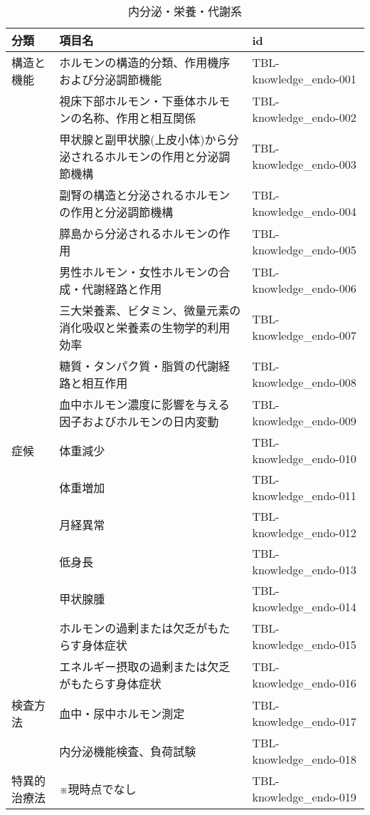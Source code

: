 \begin{xltabular}{\linewidth}{XXX}
\caption{\label{tbl:knowledge_endo}内分泌・栄養・代謝系} \\
\toprule
分類 & 項目名 & id \\
\midrule
\endhead
構造と機能 & ホルモンの構造的分類、作用機序および分泌調節機能 & TBL-knowledge_endo-001 \\
 & 視床下部ホルモン・下垂体ホルモンの名称、作用と相互関係 & TBL-knowledge_endo-002 \\
 & 甲状腺と副甲状腺(上皮小体)から分泌されるホルモンの作用と分泌調節機構 & TBL-knowledge_endo-003 \\
 & 副腎の構造と分泌されるホルモンの作用と分泌調節機構 & TBL-knowledge_endo-004 \\
 & 膵島から分泌されるホルモンの作用 & TBL-knowledge_endo-005 \\
 & 男性ホルモン・女性ホルモンの合成・代謝経路と作用 & TBL-knowledge_endo-006 \\
 & 三大栄養素、ビタミン、微量元素の消化吸収と栄養素の生物学的利用効率 & TBL-knowledge_endo-007 \\
 & 糖質・タンパク質・脂質の代謝経路と相互作用 & TBL-knowledge_endo-008 \\
 & 血中ホルモン濃度に影響を与える因子およびホルモンの日内変動 & TBL-knowledge_endo-009 \\
症候 & 体重減少 & TBL-knowledge_endo-010 \\
 & 体重増加 & TBL-knowledge_endo-011 \\
 & 月経異常 & TBL-knowledge_endo-012 \\
 & 低身長 & TBL-knowledge_endo-013 \\
 & 甲状腺腫 & TBL-knowledge_endo-014 \\
 & ホルモンの過剰または欠乏がもたらす身体症状 & TBL-knowledge_endo-015 \\
 & エネルギー摂取の過剰または欠乏がもたらす身体症状 & TBL-knowledge_endo-016 \\
検査方法 & 血中・尿中ホルモン測定 & TBL-knowledge_endo-017 \\
 & 内分泌機能検査、負荷試験 & TBL-knowledge_endo-018 \\
特異的治療法 & ※現時点でなし & TBL-knowledge_endo-019 \\
\bottomrule
\end{xltabular}

